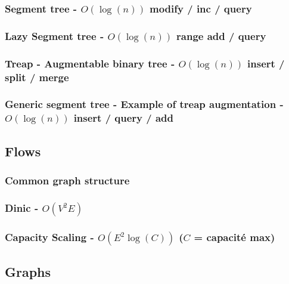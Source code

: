 \documentclass[landscape,a4paper,twocolumn,10pt]{report}
\begin{document}
\subsubsection{Segment tree - $O(\log(n))$ modify / inc / query}


\subsubsection{Lazy Segment tree - $O(\log(n))$ range add / query}


\subsubsection{Treap - Augmentable binary tree - $O(\log(n))$ insert / split / merge}


\subsubsection{Generic segment tree - Example of treap augmentation - $O(\log(n))$ insert / query / add}



\subsection*{Flows}
\label{flows}

\subsubsection{Common graph structure}


\subsubsection{Dinic - $O(V^2 E)$}


\subsubsection{Capacity Scaling - $O(E^2 \log(C))$ ($C$ = capacité max)}




\subsection*{Graphs}
\label{graphs}
\end{document}
